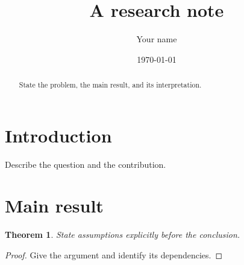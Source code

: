 \documentclass[11pt]{article}
\title{A research note}
\author{Your name}
\date{\today}
\newtheorem{theorem}{Theorem}[section]
\begin{document}
\maketitle
\begin{abstract}
State the problem, the main result, and its interpretation.
\end{abstract}
\section{Introduction}
Describe the question and the contribution.
\section{Main result}
\begin{theorem}
State assumptions explicitly before the conclusion.
\end{theorem}
\begin{proof}
Give the argument and identify its dependencies.
\end{proof}
\end{document}
